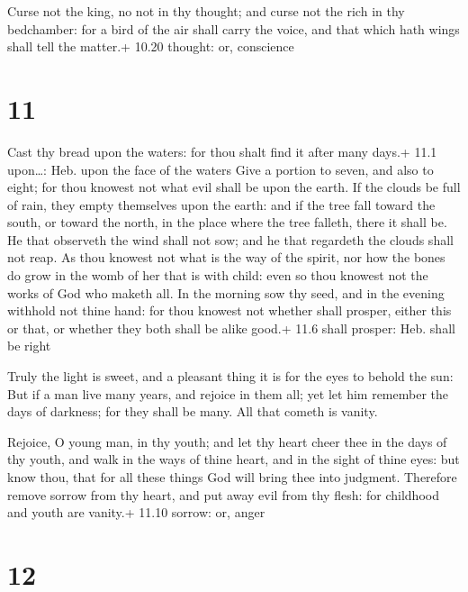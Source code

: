  Curse not the king, no not in thy thought; and curse not
the rich in thy bedchamber: for a bird of the air shall carry the voice,
and that which hath wings shall tell the matter.+ 10.20 thought: or,
conscience

\hypertarget{section-10}{%
\section{11}\label{section-10}}

 Cast thy bread upon the waters: for thou shalt find it
after many days.+ 11.1 upon\ldots: Heb. upon the face of the waters
 Give a portion to seven, and also to eight; for thou
knowest not what evil shall be upon the earth.  If the
clouds be full of rain, they empty themselves upon the earth: and if the
tree fall toward the south, or toward the north, in the place where the
tree falleth, there it shall be.  He that observeth the wind
shall not sow; and he that regardeth the clouds shall not reap.
 As thou knowest not what is the way of the spirit, nor how
the bones do grow in the womb of her that is with child: even so thou
knowest not the works of God who maketh all.  In the morning
sow thy seed, and in the evening withhold not thine hand: for thou
knowest not whether shall prosper, either this or that, or whether they
both shall be alike good.+ 11.6 shall prosper: Heb. shall be right

 Truly the light is sweet, and a pleasant thing it is for
the eyes to behold the sun:  But if a man live many years,
and rejoice in them all; yet let him remember the days of darkness; for
they shall be many. All that cometh is vanity.

 Rejoice, O young man, in thy youth; and let thy heart
cheer thee in the days of thy youth, and walk in the ways of thine
heart, and in the sight of thine eyes: but know thou, that for all these
things God will bring thee into judgment.  Therefore remove
sorrow from thy heart, and put away evil from thy flesh: for childhood
and youth are vanity.+ 11.10 sorrow: or, anger

\hypertarget{section-11}{%
\section{12}\label{section-11}}

